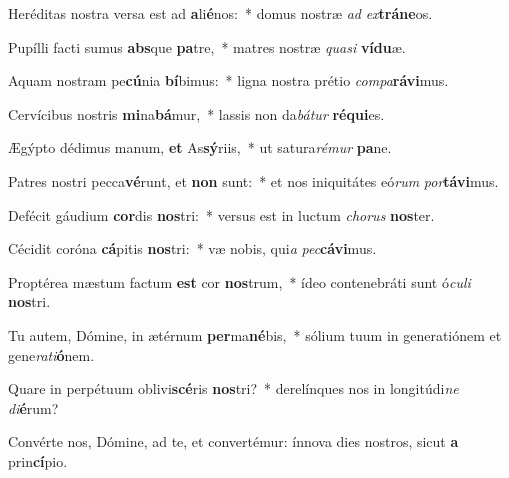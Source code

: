 \item Heréditas nostra versa est ad \textbf{a}li\textbf{é}nos:~* domus nostræ \textit{ad} \textit{ex}\textbf{trá}\textbf{ne}os.
\item Pupílli facti sumus \textbf{abs}que \textbf{pa}tre,~* matres nostræ \textit{qua}\textit{si} \textbf{ví}\textbf{du}æ.
\item Aquam nostram pe\textbf{cú}nia \textbf{bí}bimus:~* ligna nostra prétio \textit{com}\textit{pa}\textbf{rá}\textbf{vi}mus.
\item Cervícibus nostris \textbf{mi}na\textbf{bá}mur,~* lassis non da\textit{bá}\textit{tur} \textbf{ré}\textbf{qui}es.
\item Ægýpto dédimus manum, \textbf{et} As\textbf{sý}riis,~* ut satura\textit{ré}\textit{mur} \textbf{pa}ne.
\item Patres nostri pecca\textbf{vé}runt, et \textbf{non} sunt:~* et nos iniquitátes eó\textit{rum} \textit{por}\textbf{tá}\textbf{vi}mus.
\item Defécit gáudium \textbf{cor}dis \textbf{nos}tri:~* versus est in luctum \textit{cho}\textit{rus} \textbf{nos}ter.
\item Cécidit coróna \textbf{cá}pitis \textbf{nos}tri:~* væ nobis, qui\textit{a} \textit{pec}\textbf{cá}\textbf{vi}mus.
\item Proptérea mæstum factum \textbf{est} cor \textbf{nos}trum,~* ídeo contenebráti sunt ó\textit{cu}\textit{li} \textbf{nos}tri.
\item Tu autem, Dómine, in ætérnum \textbf{per}ma\textbf{né}bis,~* sólium tuum in generatiónem et gene\textit{ra}\textit{ti}\textbf{ó}nem.
\item Quare in perpétuum oblivi\textbf{scé}ris \textbf{nos}tri?~* derelínques nos in longitúdi\textit{ne} \textit{di}\textbf{é}rum?
\item Convérte nos, Dómine, ad te, et convertémur: ínnova dies nostros, sicut \textbf{a} prin\textbf{cí}pio.
